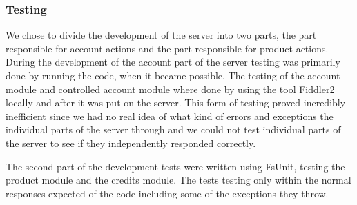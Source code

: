 \subsubsection{Testing}
We chose to divide the development of the server into two parts, the part responsible for account actions and the part responsible for product actions. During the development of the account part of the server testing was primarily done by running the code, when it became possible. The testing of the account module and controlled account module where done by using the tool Fiddler2 locally and after it was put on the server. This form of testing proved incredibly inefficient since we had no real idea of what kind of errors and exceptions the individual parts of the server through and we could not test individual parts of the server to see if they independently responded correctly.

The second part of the development tests were written using FsUnit, testing the product module and the credits module. The tests testing only within the normal responses expected of the code including some of the exceptions they throw.